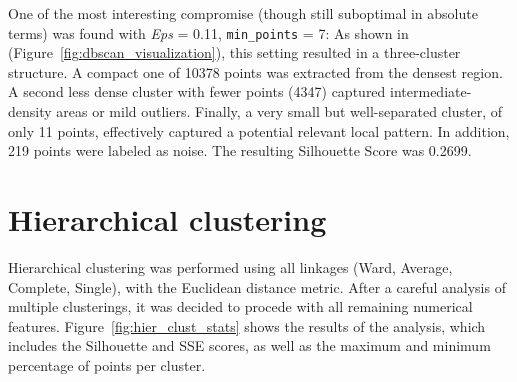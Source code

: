 One of the most interesting compromise (though still suboptimal in absolute terms) was found with \textit{Eps} = 0.11, \texttt{min\_points} = 7: 
As shown in (Figure~\ref{fig:dbscan_visualization}), this setting resulted in a three-cluster structure. A compact one of 10378 points was extracted from the densest region.
A second less dense cluster with fewer points (4347) captured intermediate-density areas or mild outliers. 
Finally, a very small but well-separated cluster, of only 11 points, effectively captured a potential relevant local pattern. 
In addition, 219 points were labeled as noise.
The resulting Silhouette Score was 0.2699.












\section{Hierarchical clustering}\label{sec:hierarchical}
Hierarchical clustering was performed using all linkages (Ward, Average, Complete, Single), with the Euclidean
distance metric. After a careful analysis of multiple clusterings, it was decided to procede with
all remaining numerical features.
Figure~\ref{fig:hier_clust_stats} shows the results of the analysis, which includes the Silhouette and SSE
scores, as well as the maximum and minimum percentage of points per cluster.\\

